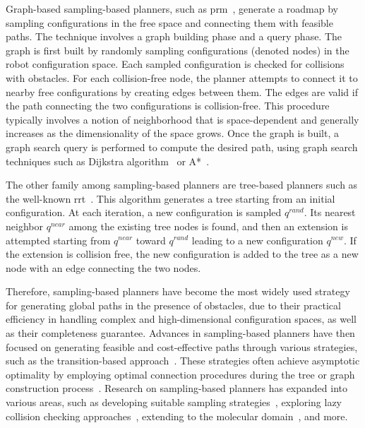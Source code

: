 Graph-based sampling-based planners, such as \gls{prm}~\cite{cPRM}, generate a roadmap by sampling configurations in the free space and connecting them with feasible paths. 
The technique involves a graph building phase and a query phase.
The graph is first built by randomly sampling configurations (denoted nodes) in the robot configuration space.
Each sampled configuration is checked for collisions with obstacles.
For each collision-free node, the planner attempts to connect it to nearby free configurations by creating edges between them.  
The edges are valid if the path connecting the two configurations is collision-free.
This procedure typically involves a notion of neighborhood that is space-dependent and generally increases as the dimensionality of the space grows.
Once the graph is built, a graph search query is performed to compute the desired path, using graph search techniques such as Dijkstra algorithm~\cite{cDijk} or A*~\cite{cA*}.

The other family among sampling-based planners are tree-based planners such as the well-known \gls{rrt}~\cite{cRRT}.
This algorithm generates a tree starting from an initial configuration.
At each iteration, a new configuration is sampled $q^{rand}$.
Its nearest neighbor $q^{near}$ among the existing tree nodes is found, and then an extension is attempted starting from $q^{near}$ toward $q^{rand}$ leading to a new configuration $q^{new}$.
If the extension is collision free, the new configuration is added to the tree as a new node with an edge connecting the two nodes.

Therefore, sampling-based planners have become the most widely used strategy for generating global paths in the presence of obstacles, due to their practical efficiency in handling complex and high-dimensional configuration spaces, as well as their completeness guarantee.
Advances in sampling-based planners have then focused on generating feasible and cost-effective paths through various strategies, such as the transition-based approach~\cite{cTRRT}. 
These strategies often achieve asymptotic optimality by employing optimal connection procedures during the tree or graph construction process~\cite{cRRTstar, cTRRTstar, cFMT}.
Research on sampling-based planners has expanded into various areas, such as developing suitable sampling strategies~\cite{cSampling}, exploring lazy collision checking approaches~\cite{cLazy1}, extending to the molecular domain~\cite{cMolecular}, and more.

